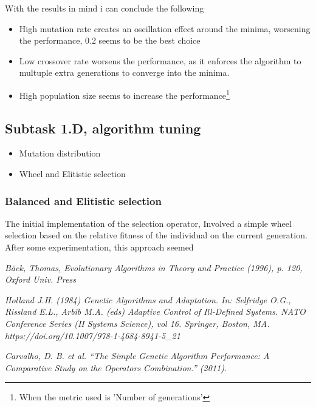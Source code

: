 \documentclass[openany]{article}
\begin{document}
			With the results in mind i can conclude the following 
			\begin{itemize}
				\item High mutation rate creates an oscillation effect around the minima, worsening the performance, 0.2 seems to be the best choice
				\item Low crossover rate worsens the performance, as it enforces the algorithm to multuple extra generations to converge into the minima.
				\item High population size seems to increase the performance\footnote{When the metric used is 'Number of generations'}
			\end{itemize}
		\subsection{Subtask 1.D, algorithm tuning}
			\begin{itemize}
				\item Mutation distribution
				\item Wheel and Elitistic selection
			\end{itemize}
			\subsubsection{Balanced and Elitistic selection}
				The initial implementation of the selection operator, Involved a simple wheel selection based on the relative fitness of the individual on the current generation.
				After some experimentation, this approach seemed 

		
		
		
\begin{thebibliography}{1}	
	\textit{Bäck, Thomas, Evolutionary Algorithms in Theory and Practice (1996), p. 120, Oxford Univ. Press}
	
	\textit{Holland J.H. (1984) Genetic Algorithms and Adaptation. In: Selfridge O.G., Rissland E.L., Arbib M.A. (eds) Adaptive Control of Ill-Defined Systems. NATO Conference Series (II Systems Science), vol 16. Springer, Boston, MA. https://doi.org/10.1007/978-1-4684-8941-5\_21}
	
	\textit{Carvalho, D. B. et al. “The Simple Genetic Algorithm Performance: A Comparative Study on the Operators Combination.” (2011).}
	
\end{thebibliography}
			
\end{document}
